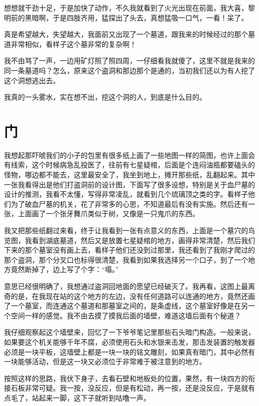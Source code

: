 想想就干劲十足，于是加快了动作，不久我就看到了火光出现在前面，我大喜，黎明前的黑暗啊，于是四肢齐用，猛探出了头去，真想猛吸一口气，一看！呆了。

真是希望越大，失望越大，我面前又出现了一个墓道，跟我来的时候经过的那个墓道非常相似，看样子这个墓非常的复杂啊！

我不由骂了一声，一边用矿灯照了照四周，一仔细看我就傻了，这里不就是我来的同一条墓道吗？怎么，原来这个盗洞和那边那个是通的，当初我们还以为有人挖了这个洞想逃出去。

我真的一头雾水，实在想不出，挖这个洞的人，到底是什么目的。

\chapter{门}

我想起那吓唬我们的小子的包里有很多纸上画了一些地图一样的简图，也许上面会有线索，这个时候病急乱投医了，往前有七星疑棺，后面是个连闷油瓶都要磕头的怪物，哪边都不能去，这里最安全了，我坐到地上，摊开那些纸，乱翻起来。其中一张我看得出是他们打盗洞前的设计图，下面写了很多设想，特别是关于血尸墓的设计的推测，我看不太懂，写得非常凌乱，就看到几个琉璃顶之类的字。看样子他们为了破血尸墓的机关，花了非常多的心思，不知道最后有没有实施。然后还有一张，上面画了一个张牙舞爪类似于树，又像是一只鬼爪的东西。

我又把那些纸翻过来看，终于让我看到一张有点意义的东西，上面是一个墓穴的鸟览图，我看到湖底墓道，然后又是放置七星疑棺的地方，画得非常清楚，然后我们下来的那个墓室没有画上去，看样子他们还没到过那里，我还看到了我刚才爬过的那个盗洞，那个分叉口也标得很清楚，我看到如果我选择另一个口子，到了一个地方竟然断掉了，边上写了个字：“塌。”

意思已经很明确了，我想通过盗洞回地面的愿望已经破灭了。我再看，这图上最离奇的是，在我现在站的这个地方的左边，没有任何道路可以连通的地方，竟然还画了一个墓室，而连通这个墓道和那墓室之间的，是条虚线，这个墓室好像是在另一个空间一样的感觉。我不由去摸了摸我后面的墙壁，难道这墙后面有个秘道？

我仔细观察起这个墙壁来，回忆了一下爷爷笔记里那些石头暗门构造。一般来说，如果要这个机关能够千年不腐，必须使用石头和水银来击发，那击发装置的触发器必须是一块平板，这墙壁上都是一块一块的铭文雕刻，如果真有暗门，其中必然有一块能够活动，但是这一块又必须位于非常难于被注意到的地方。

按照这样的思路，我伏下身子，去看石壁和地板处的位置，果然，有一块四方的衔接石板非常可疑。我一按，没反应，但是有松动，再一按，还是没反应，于是就有点毛了，站起来一脚，这下子就听到咕噜一声。

